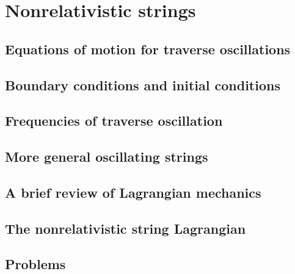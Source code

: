 \documentclass[12pt]{report}
\begin{document}
\chapter{Nonrelativistic strings}
\newpage
\section{Equations of motion for traverse oscillations}
\section{Boundary conditions and initial conditions}
\section{Frequencies of traverse oscillation}
\section{More general oscillating strings}
\section{A brief review of Lagrangian mechanics}
\section{The nonrelativistic string Lagrangian}
\section{Problems}
\end{document}

